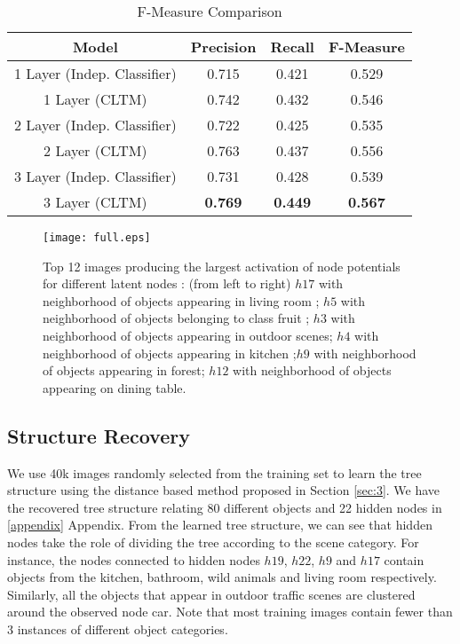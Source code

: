 \documentclass{article}
\begin{document}
\begin{table}[ht]
\caption{F-Measure  Comparison}




\centering
\begin{tabular}{|c c c c|}
\hline\hline
Model & Precision & Recall & F-Measure \\ [0.3ex]
\hline
1 Layer (Indep. Classifier) & 0.715 & 0.421 & 0.529 \\
1 Layer (CLTM) & 0.742 & 0.432 & 0.546 \\
2 Layer (Indep. Classifier) & 0.722 & 0.425 & 0.535 \\
2 Layer (CLTM) & 0.763 & 0.437 & 0.556 \\
3 Layer (Indep. Classifier) & 0.731 & 0.428 & 0.539 \\
3 Layer (CLTM)  & \textbf{0.769} & \textbf{0.449} & \textbf{0.567} \\
\hline
\end{tabular}
\label{table:nonlin}
\end{table}

\begin{figure}
\begin{center}

\texttt{[image: full.eps]}

\end{center}

\caption{Top 12 images producing the largest activation of node potentials for different latent nodes : (from left to right) $h17$  with neighborhood of objects appearing in living room ; $h5$ with neighborhood of objects belonging to class fruit ; $h3$ with neighborhood of objects appearing in outdoor scenes; $h4$ with neighborhood of objects appearing in kitchen ;$h9$ with neighborhood of objects appearing in forest; $h12$ with neighborhood of objects appearing on dining table. }
\label{fig:topkimages}

\end{figure}






\subsection{Structure Recovery}

We use 40k images randomly selected from the training set to learn the tree structure using the distance based method proposed in Section \ref{sec:3}. We have the recovered tree structure relating 80 different objects and 22 hidden nodes in \ref{appendix} Appendix. From the learned tree structure, we can see that hidden nodes take the role of dividing the tree according to the scene category. For instance, the nodes connected to hidden nodes $h19$, $h22$, $h9$ and $h17$  contain objects from the kitchen, bathroom, wild animals and living room respectively. Similarly, all the objects that appear in outdoor traffic scenes are clustered around the observed node car. Note that most training images contain fewer than 3 instances of different object categories.
\end{document}

